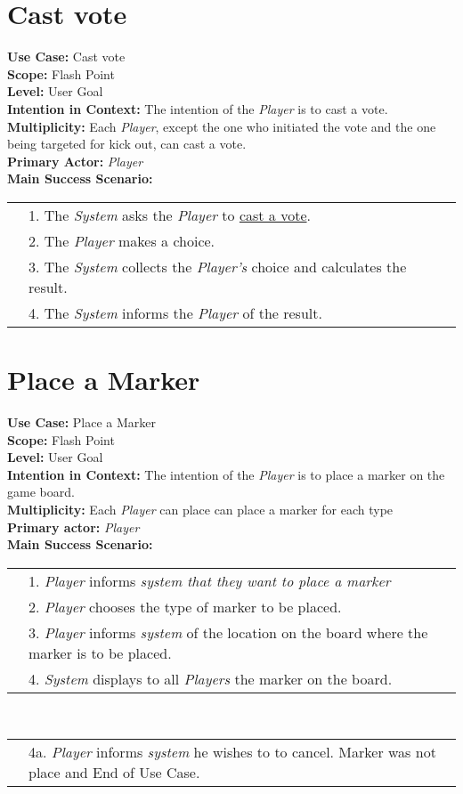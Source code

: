 \documentclass{article}
\begin{document}
	\section*{Cast vote}
	\textbf{Use Case:} Cast vote\\
	\textbf{Scope:} Flash Point\\
	\textbf{Level:} User Goal\\
	\textbf{Intention in Context:} The intention of the \textit{Player} is to cast a vote.\\
	\textbf{Multiplicity: }Each \textit{Player}, except the one who initiated the vote and the one being targeted for kick out, can cast a vote.\\
	\textbf{Primary Actor:} \textit{Player}\\
	\textbf{Main Success Scenario:}\\
	\begin{tabular}{l l}
		&1. The \textit{System} asks the \textit{Player} to \underline{cast a vote}.\\
		&2. The \textit{Player} makes a choice.\\
		&3. The \textit{System} collects the \textit{Player's} choice and calculates the result.\\
		&4. The \textit{System} informs the \textit{Player} of the result.
	\end{tabular}
	\section*{Place a Marker}
	\textbf{Use Case:} Place a Marker\\
	\textbf{Scope:} Flash Point\\
	\textbf{Level:} User Goal\\
	\textbf{Intention in Context:} The intention of the \textit{Player} is to place a marker on the game board.\\
	\textbf{Multiplicity: }Each \textit{Player} can place can place a marker for each type\\
	\textbf{Primary actor:} \textit{Player}\\
	\textbf{Main Success Scenario:}\\
	\begin{tabular}{l l}
		&1. \textit{Player} informs \textit{system that they want to place a marker}\\
		&2. \textit{Player} chooses the type of marker to be placed.\\
		&3. \textit{Player} informs \textit{system} of the location on the board where the marker is to be placed.\\
		&4. \textit{System} displays to all \textit{Players} the marker on the board.
	\end{tabular}\\
	\begin{tabular}{l l}
		
		&4a. \textit{Player} informs \textit{system} he wishes to to cancel. Marker was not place and End of Use Case.
	\end{tabular}
\end{document}
